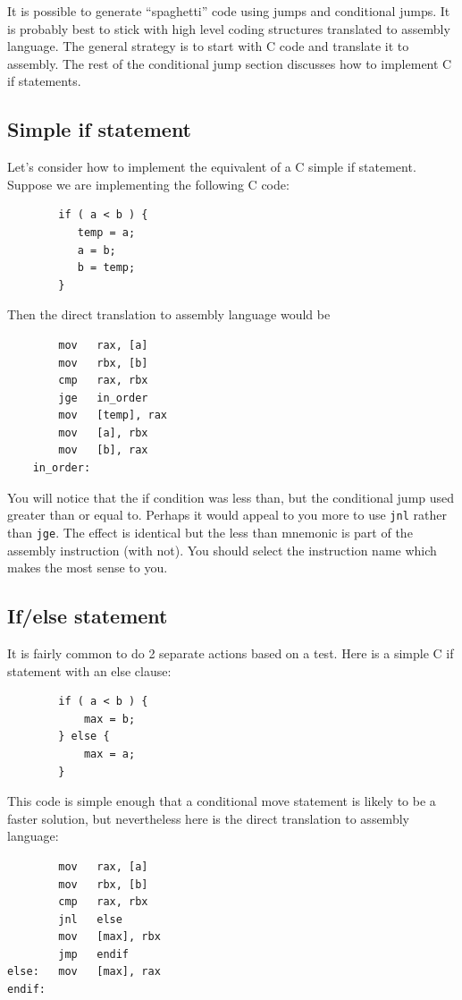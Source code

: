 \documentclass[11pt,b5paper]{book}
\begin{document}
It is possible to generate ``spaghetti'' code using jumps and conditional jumps.
It is probably best to stick with high level coding structures translated to
assembly language.
The general strategy is to start with C code and translate it to assembly.
The rest of the conditional jump section discusses how to implement C if statements.

\subsection{Simple if statement}

Let's consider how to implement the equivalent of a C simple if statement. 
Suppose we are implementing the following C code:
\begin{verbatim}
        if ( a < b ) {
           temp = a;
           a = b;
           b = temp;
        }
\end{verbatim}
Then the direct translation to assembly language would be
\begin{verbatim}
        mov   rax, [a]
        mov   rbx, [b]
        cmp   rax, rbx
        jge   in_order
        mov   [temp], rax
        mov   [a], rbx
        mov   [b], rax
    in_order:
\end{verbatim}

You will notice that the if condition was less than, but the conditional jump used greater than or equal to.
Perhaps it would appeal to you more to use {\tt jnl} rather than {\tt jge}.
The effect is identical but the less than mnemonic is part of the assembly instruction (with not).
You should select the instruction name which makes the most sense to you.

\subsection{If/else statement}

It is fairly common to do 2 separate actions based on a test. 
Here is a simple C if statement with an else clause:
\begin{verbatim}
        if ( a < b ) {
            max = b;
        } else {
            max = a;
        }
\end{verbatim}
This code is simple enough that a conditional move statement is likely to be a faster solution, but nevertheless
here is the direct translation to assembly language:
\begin{verbatim}
        mov   rax, [a]
        mov   rbx, [b]
        cmp   rax, rbx
        jnl   else
        mov   [max], rbx
        jmp   endif
else:   mov   [max], rax
endif:
\end{verbatim}
\end{document}

